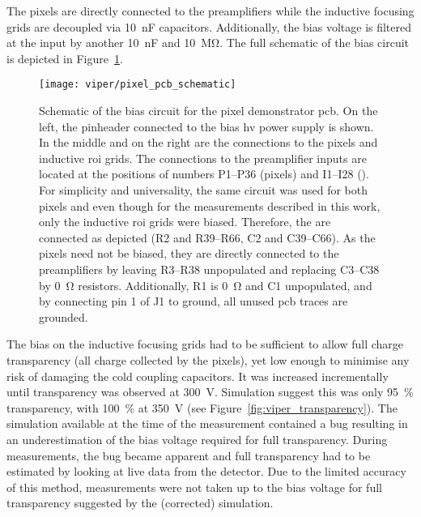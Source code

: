 The pixels are directly connected to the preamplifiers while the inductive focusing grids are decoupled via \SI{10}{\nano\farad} capacitors.
Additionally, the bias voltage is filtered at the input by another \SI{10}{\nano\farad} and \SI{10}{\mega\ohm}.
The full schematic of the bias circuit is depicted in Figure~\ref{fig:viper_pcb_schematic}.

\begin{figure}[htb]
	\centering
	\texttt{[image: viper/pixel\_pcb\_schematic]}
	\caption[Pixel demonstrator bias circuit]{%
		Schematic of the bias circuit for the \AC{} pixel demonstrator \acrshort{pcb}.
		On the left, the pinheader connected to the bias \acrshort{hv} power supply is shown. In the middle and on the right are the connections to the pixels and inductive \acrshort{roi} grids.
		The connections to the preamplifier inputs are located at the positions of numbers P1--P36 (pixels) and I1--I28 ().
		For simplicity and universality, the same circuit was used for both pixels and  even though for the measurements described in this work, only the inductive \acrshort{roi} grids were biased.
		Therefore, the  are connected as depicted (R2 and R39--R66, C2 and C39--C66).
		As the pixels need not be biased, they are directly connected to the preamplifiers by leaving R3--R38 unpopulated and replacing C3--C38 by \SI{0}{\ohm} resistors.
		Additionally, R1 is \SI{0}{\ohm} and C1 unpopulated, and by connecting pin 1 of J1 to ground, all unused \acrshort{pcb} traces are grounded.
	}
	\label{fig:viper_pcb_schematic}
\end{figure}

The bias on the inductive focusing grids had to be sufficient to allow full charge transparency (all charge collected by the pixels), yet low enough to minimise any risk of damaging the cold coupling capacitors.
It was increased incrementally until transparency was observed at \SI{300}{\volt}. 
Simulation suggest this was only \SI{95}{\percent} transparency, with \SI{100}{\percent} at \SI{350}{\volt} (see Figure~\ref{fig:viper_transparency}).
The simulation available at the time of the measurement contained a bug resulting in an underestimation of the bias voltage required for full transparency.
During measurements, the bug became apparent and full transparency had to be estimated by looking at live data from the detector.
Due to the limited accuracy of this method, measurements were not taken up to the bias voltage for full transparency suggested by the (corrected) simulation.~\cite{francypants}

